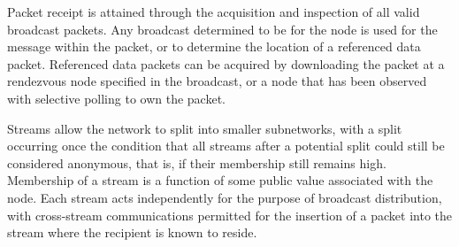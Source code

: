 Packet receipt is attained through the acquisition and inspection of all valid broadcast packets. Any broadcast determined to be for the node is used for the message within the packet, or to determine the location of a referenced data packet. Referenced data packets can be acquired by downloading the packet at a rendezvous node specified in the broadcast, or a node that has been observed with selective polling to own the packet.

Streams allow the network to split into smaller subnetworks, with a split occurring once the condition that all streams after a potential split could still be considered anonymous, that is, if their membership still remains high. Membership of a stream is a function of some public value associated with the node. Each stream acts independently for the purpose of broadcast distribution, with cross-stream communications permitted for the insertion of a packet into the stream where the recipient is known to reside.